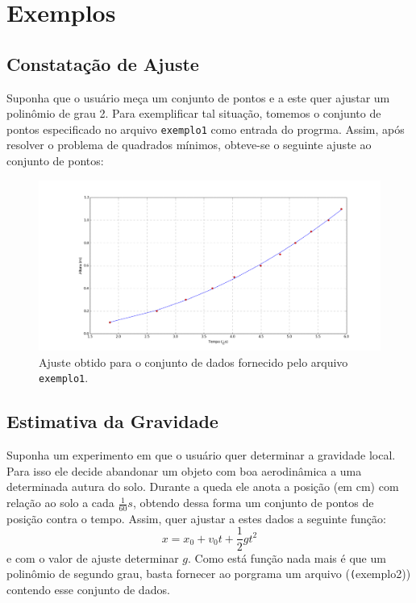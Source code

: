 \documentclass [a4paper,10pt]{article}
\begin{document}
{    \section{Exemplos}
    \subsection{Constatação de Ajuste}
    Suponha que o usuário meça um conjunto de pontos e a este quer ajustar um polinômio de grau 2. Para exemplificar
    tal situação, tomemos o conjunto de pontos especificado no arquivo \texttt{exemplo1} como entrada do progrma.
    Assim, após resolver o problema de quadrados mínimos, obteve-se o seguinte ajuste ao conjunto de pontos:
    \begin{figure}[!ht]
        \centering
        \includegraphics[scale=0.31]{exemplo1.png}
        \caption{Ajuste obtido para o conjunto de dados fornecido pelo arquivo \texttt{exemplo1}.}
    \end{figure}
    
    \subsection{Estimativa da Gravidade}
    Suponha um experimento em que o usuário quer determinar a gravidade local. Para isso ele decide abandonar um
    objeto com boa aerodinâmica a uma determinada autura do solo. Durante a queda ele anota a posição (em cm) com relação ao
    solo a cada $\frac{1}{60}s$, obtendo dessa forma um conjunto de pontos de posição contra o tempo.
    Assim, quer ajustar a estes dados a seguinte
    função:
    \begin{equation}\label{fisica}
        x = x_0 + v_0 t + \frac{1}{2}gt^2
    \end{equation}
    e com o valor de ajuste determinar $g$. Como está função nada mais é que um polinômio de segundo grau, basta fornecer
    ao porgrama um arquivo (\texttt(exemplo2)) contendo esse conjunto de dados.  
    
}
\end{document}
